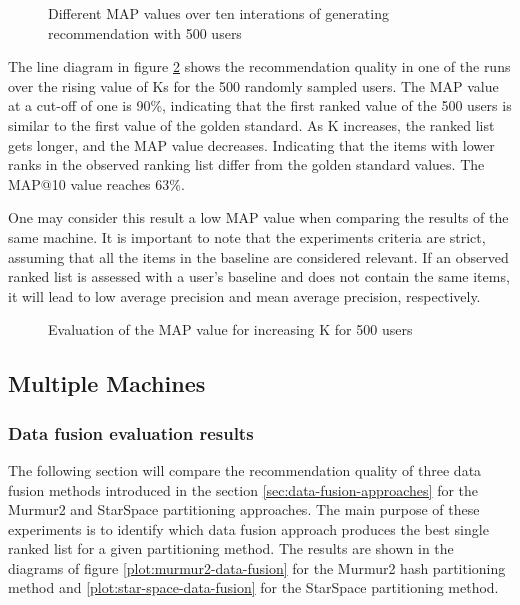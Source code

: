 \begin{figure}[!h]
    \centering
    
    \caption{Different MAP values over ten interations of generating recommendation with 500 users}
    \label{plot:single-partition-boxplot}
\end{figure}



The line diagram in figure \ref{plot:single-partition} shows the recommendation quality in one of the runs over the rising value of Ks for the 500 randomly sampled users. The MAP value at a cut-off of one is 90\%, indicating that the first ranked value of the 500 users is similar to the first value of the golden standard. As K increases, the ranked list gets longer, and the MAP value decreases. Indicating that the items with lower ranks in the observed ranking list differ from the golden standard values. The MAP@10 value reaches 63\%. 


One may consider this result a low MAP value when comparing the results of the same machine. It is important to note that the experiments criteria are strict, assuming that all the items in the baseline are considered relevant. If an observed ranked list is assessed with a user's baseline and does not contain the same items, it will lead to low average precision and mean average precision, respectively.

\begin{figure}[!h]
    \centering
    
    \caption{Evaluation of the MAP value for increasing K for 500 users}
    \label{plot:single-partition}
\end{figure}

\subsection{Multiple Machines}
\label{subsec:eval-multiple-machines}

\subsubsection{Data fusion evaluation results}
\label{subsubsec:eval-data-fusion}
The following section will compare the recommendation quality of three data fusion methods introduced in the section \ref{sec:data-fusion-approaches} for the Murmur2 and StarSpace partitioning approaches. The main purpose of these experiments is to identify which data fusion approach produces the best single ranked list for a given partitioning method. The results are shown in the diagrams of figure \ref{plot:murmur2-data-fusion} for the Murmur2 hash partitioning method and \ref{plot:star-space-data-fusion} for the StarSpace partitioning method.


